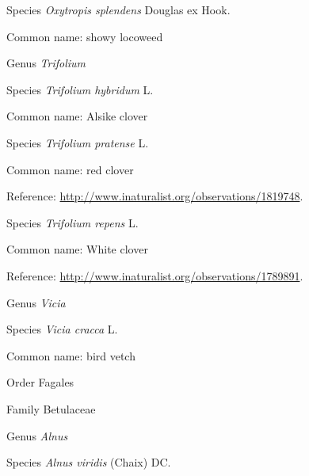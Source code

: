 \documentclass[9pt, article]{memoir}
\begin{document}
\begin{multicols}{2}
\vspace{6pt}\noindent\hspace{36pt}Species \textit{Oxytropis splendens} Douglas ex Hook.


Common name: showy locoweed

\vspace{6pt}\noindent\hspace{30pt}Genus \textit{Trifolium}


\vspace{6pt}\noindent\hspace{36pt}Species \textit{Trifolium hybridum} L.


Common name: Alsike clover

\vspace{6pt}\noindent\hspace{36pt}Species \textit{Trifolium pratense} L.


Common name: red clover

Reference: 
\url{http://www.inaturalist.org/observations/1819748}.

\vspace{6pt}\noindent\hspace{36pt}Species \textit{Trifolium repens} L.


Common name: White clover

Reference: 
\url{http://www.inaturalist.org/observations/1789891}.

\vspace{6pt}\noindent\hspace{30pt}Genus \textit{Vicia}


\vspace{6pt}\noindent\hspace{36pt}Species \textit{Vicia cracca} L.


Common name: bird vetch

\vspace{6pt}\noindent\hspace{18pt}Order Fagales


\vspace{6pt}\noindent\hspace{24pt}Family Betulaceae


\vspace{6pt}\noindent\hspace{30pt}Genus \textit{Alnus}


\vspace{6pt}\noindent\hspace{36pt}Species \textit{Alnus viridis} (Chaix) DC.



\end{multicols}
\end{document}
